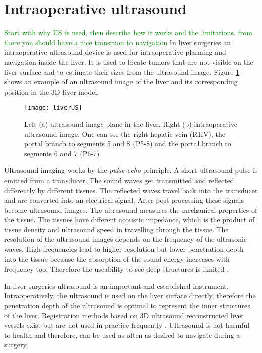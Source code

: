 
\section{Intraoperative ultrasound}
\textcolor{green}{Start with why US is used, then describe how it works and the limitations. from there you should have a nice transition to navigation}
In
liver surgeries an intraoperative ultrasound device is used for intraoperative planning and
navigation inside the liver. It is used to locate tumors that are not
visible on the liver surface and to estimate their sizes from the ultrasound image. Figure \ref{fig:liverUS} shows an example of an
ultrasound image of the liver and its corresponding position in the 3D liver
model.

\begin{figure}[H]
  \centering
 \texttt{[image: liverUS]}
 \caption{ Left (a) ultrasound image plane in the liver. Right (b) intraoperative
   ultrasound image. One can see the right hepatic vein (RHV), the portal branch
   to segments 5 and 8 (P5-8) and the portal branch to segments 6 and 7 (P6-7) \cite{torzilli2014ultrasound}}
  \label{fig:liverUS}
\end{figure}

Ultrasound imaging works by the \textit{pulse-echo} principle. A short
ultrasound pulse is emitted from a transducer. The sound waves get
transmitted and reflected differently by different tissues. The reflected
 waves travel back into the transducer and are converted into an electrical
signal. After post-processing these signals become ultrasound images. 
The ultrasound measures the mechanical properties of the tissue. The tissues
have different acoustic impedance, which is the product of tissue density and
ultrasound speed in travelling through the tissue. The resolution of the
ultrasound images depends on the frequency of the ultrasonic waves. High
frequencies lead to higher resolution but lower penetration depth into the tissue because the
absorption of the sound energy increases with frequency too. Therefore the
useability to see deep structures is limited \cite{torzilli2014ultrasound}. 

In liver surgeries ultrasound is an important and established instrument.
Intraoperatively, the ultrasound is used on the liver surface directly,
therefore the penetration depth of the
ultrasound is optimal to represent the inner structures of the liver.
Registration methods based on 3D ultrasound reconstructed liver vessels 
exist but are not used in practice frequently \cite{lange2003vessel}. Ultrasound
is not harmful to health and therefore, can
be used as often as desired to navigate during a surgery.

